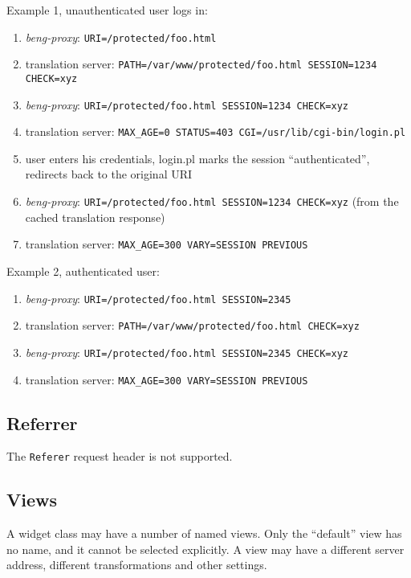 \documentclass[a4paper,12pt]{article}
\begin{document}
Example 1, unauthenticated user logs in:

\begin{enumerate}
\item \emph{beng-proxy}: \texttt{URI=/protected/foo.html}
\item translation server: \texttt{PATH=/var/www/protected/foo.html
  SESSION=1234 CHECK=xyz}
\item \emph{beng-proxy}: \texttt{URI=/protected/foo.html SESSION=1234
  CHECK=xyz}
\item translation server: \texttt{MAX\_AGE=0 STATUS=403
  CGI=/usr/lib/cgi-bin/login.pl}
\item user enters his credentials, login.pl marks the session
  ``authenticated'', redirects back to the original URI
\item \emph{beng-proxy}: \texttt{URI=/protected/foo.html SESSION=1234
  CHECK=xyz} (from the cached translation response)
\item translation server: \texttt{MAX\_AGE=300 VARY=SESSION PREVIOUS}
\end{enumerate}

Example 2, authenticated user:

\begin{enumerate}
\item \emph{beng-proxy}: \texttt{URI=/protected/foo.html SESSION=2345}
\item translation server: \texttt{PATH=/var/www/protected/foo.html
  CHECK=xyz}
\item \emph{beng-proxy}: \texttt{URI=/protected/foo.html SESSION=2345
  CHECK=xyz}
\item translation server: \texttt{MAX\_AGE=300 VARY=SESSION PREVIOUS}
\end{enumerate}


\subsection{Referrer}

The \texttt{Referer} request header is not supported.

\subsection{Views}

A widget class may have a number of named views.  Only the ``default''
view has no name, and it cannot be selected explicitly.  A view may
have a different server address, different transformations and other
settings.
\end{document}
